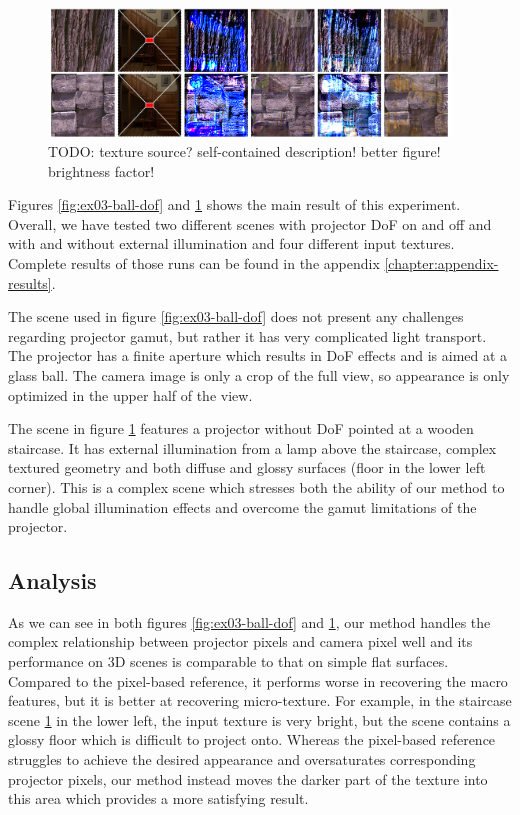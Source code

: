 \begin{figure}[ht]
    \begin{center}
        \includegraphics[width=0.95\textwidth]{images/ex03-staircase-illum-crop.png}
        \caption{{\color{red} TODO: texture source? self-contained description! better figure! brightness factor!}}
        \label{fig:ex03-staircase-illum}
    \end{center}
\end{figure}

Figures \ref{fig:ex03-ball-dof} and \ref{fig:ex03-staircase-illum} shows the main result of this experiment. Overall, we have tested two different scenes with projector DoF on and off and with and without external illumination and four different input textures. Complete results of those runs can be found in the appendix \ref{chapter:appendix-results}.

The scene used in figure \ref{fig:ex03-ball-dof} does not present any challenges regarding projector gamut, but rather it has very complicated light transport. The projector has a finite aperture which results in DoF effects and is aimed at a glass ball. The camera image is only a crop of the full view, so appearance is only optimized in the upper half of the view.

The scene in figure \ref{fig:ex03-staircase-illum} features a projector without DoF pointed at a wooden staircase. It has external illumination from a lamp above the staircase, complex textured geometry and both diffuse and glossy surfaces (floor in the lower left corner). This is a complex scene which stresses both the ability of our method to handle global illumination effects and overcome the gamut limitations of the projector.

\subsection{Analysis}
\label{section:results-experiments-03-analysis}

As we can see in both figures \ref{fig:ex03-ball-dof} and \ref{fig:ex03-staircase-illum}, our method handles the complex relationship between projector pixels and camera pixel well and its performance on 3D scenes is comparable to that on simple flat surfaces. Compared to the pixel-based reference, it performs worse in recovering the macro features, but it is better at recovering micro-texture. For example, in the staircase scene \ref{fig:ex03-staircase-illum} in the lower left, the input texture is very bright, but the scene contains a glossy floor which is difficult to project onto. Whereas the pixel-based reference struggles to achieve the desired appearance and oversaturates corresponding projector pixels, our method instead moves the darker part of the texture into this area which provides a more satisfying result.

